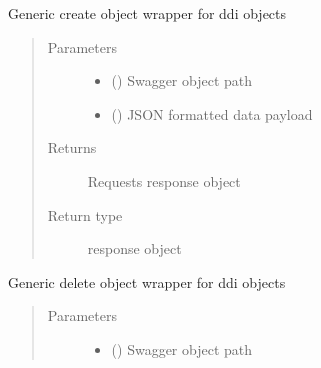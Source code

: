 \documentclass[letterpaper,10pt,english]{sphinxmanual}
\begin{document}
\begin{fulllineitems}
\begin{fulllineitems}
\begin{quote}
\begin{description}
\end{description}\end{quote}

\end{fulllineitems}


\begin{fulllineitems}
\label{\detokenize{b1ddi-class:bloxone.b1ddi.create}}
\sphinxAtStartPar
Generic create object wrapper for ddi objects
\begin{quote}\begin{description}
\item[{Parameters}] \leavevmode\begin{itemize}
\item {} 
\sphinxAtStartPar
{} () \textendash{} Swagger object path

\item {} 
\sphinxAtStartPar
{} () \textendash{} JSON formatted data payload

\end{itemize}

\item[{Returns}] \leavevmode
\sphinxAtStartPar
Requests response object

\item[{Return type}] \leavevmode
\sphinxAtStartPar
response object

\end{description}\end{quote}

\end{fulllineitems}


\begin{fulllineitems}
\label{\detokenize{b1ddi-class:bloxone.b1ddi.delete}}
\sphinxAtStartPar
Generic delete object wrapper for ddi objects
\begin{quote}\begin{description}
\item[{Parameters}] \leavevmode\begin{itemize}
\item {} 
\sphinxAtStartPar
{} () \textendash{} Swagger object path


\end{itemize}
\end{description}
\end{quote}
\end{fulllineitems}
\end{fulllineitems}
\end{document}
